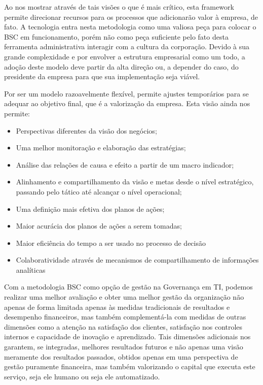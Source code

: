 Ao nos mostrar através de tais visões o que é mais crítico, esta framework permite direcionar recursos para os processos que adicionarão valor à empresa, de fato. A tecnologia entra nesta metodologia como uma valiosa peça para colocar o BSC em funcionamento, porém não como peça suficiente pelo fato desta ferramenta administrativa interagir com a cultura da corporação. Devido à sua grande complexidade e por envolver a estrutura empresarial como um todo, a adoção deste modelo deve partir da alta direção ou, a depender do caso, do presidente da empresa para que sua implementação seja viável.

Por ser um modelo razoavelmente flexível, permite ajustes temporários para se adequar ao objetivo final, que é a valorização da empresa. Esta visão ainda nos permite:

\begin{itemize}
\item Perspectivas diferentes da visão dos negócios;
\item Uma melhor monitoração e elaboração das estratégias;
\item Análise das relações de causa e efeito a partir de um macro indicador;
\item Alinhamento e compartilhamento da visão e metas desde o nível estratégico, passando pelo tático até alcançar o nível operacional;
\item Uma definição mais efetiva dos planos de ações;
\item Maior acurácia dos planos de ações a serem tomadas;
\item Maior eficiência do tempo a ser usado no processo de decisão
\item Colaboratividade através de mecanismos de compartilhamento de informações analíticas
\end{itemize}

Com a metodologia BSC como opção de gestão na Governança em TI, podemos realizar uma melhor avaliação e obter uma melhor gestão da organização não apenas de forma limitada apenas às medidas tradicionais de resultados e desempenho financeiros, mas também complementá-la com medidas de outras dimensões como a atenção na satisfação dos clientes, satisfação nos controles internos e capacidade de inovação e aprendizado. Tais dimensões adicionais nos garantem, se integradas, melhores resultados futuros e não apenas uma visão meramente dos resultados passados, obtidos apenas em uma perspectiva de gestão puramente financeira, mas também valorizando o capital que executa este serviço, seja ele humano ou seja ele automatizado.

